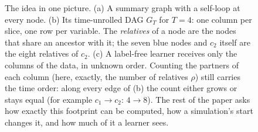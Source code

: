 \documentclass[pdflatex,sn-apa]{sn-jnl}
\newcommand{\tikzfig}[1]{\adjustbox{max width=\textwidth,center}{}}
\theoremstyle{thmstyleone}
\theoremstyle{thmstylethree}
\theoremstyle{thmstyletwo}
\begin{document}
\begin{figure}[t]
\centering
\tikzfig{fig_hero}
\caption{The idea in one picture. (a) A summary graph with a self-loop at every node.
(b) Its time-unrolled DAG $G_T$ for $T=4$: one column per slice, one row per variable.
The \emph{relatives} of a node are the nodes that share an ancestor with it; the seven blue nodes
and $c_2$ itself are the eight relatives of $c_2$. (c) A label-free learner receives only the columns of the data, in unknown order.
Counting the partners of each column (here, exactly, the number of relatives $\rho$) still carries the time
order: along every edge of (b) the count either grows or stays equal (for example $c_1\to c_2$: $4\to 8$).
The rest of the paper asks how exactly this footprint can be computed, how a simulation's start changes it,
and how much of it a learner sees.}
\label{fig:hero}
\end{figure}
\end{document}

